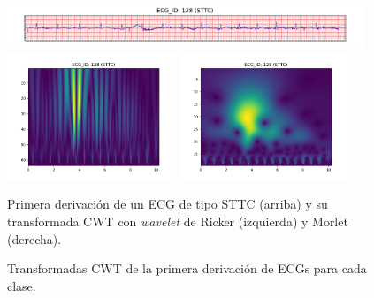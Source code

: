 \begin{figure}[t]
	\includegraphics[width=0.95\textwidth]{Imagenes/Vectorial/Transformadas/STTC/ecg.png}
	\includegraphics[width=0.45\textwidth]{Imagenes/Vectorial/Transformadas/STTC/cwt_ricker.png}
	\includegraphics[width=0.45\textwidth]{Imagenes/Vectorial/Transformadas/STTC/cwt_morlet.png}
	\par Primera derivación de un ECG de tipo STTC (arriba) y su transformada CWT con \emph{wavelet} de Ricker (izquierda) y Morlet (derecha).
	\caption{Transformadas CWT de la primera derivación de ECGs para cada clase.}
\end{figure}
